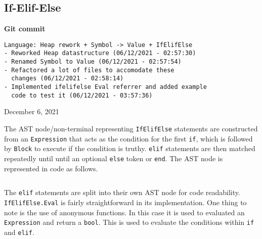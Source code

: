 \subsection{If-Elif-Else}

\begin{center}
    \textbf{Git commit}
    \begin{verbatim}
Language: Heap rework + Symbol -> Value + IfElifElse
- Reworked Heap datastructure (06/12/2021 - 02:57:30)
- Renamed Symbol to Value (06/12/2021 - 02:57:54)
- Refactored a lot of files to accomodate these 
  changes (06/12/2021 - 02:58:14)
- Implemented ifelifelse Eval referrer and added example
  code to test it (06/12/2021 - 03:57:36)
    \end{verbatim}
    \vspace{-1em}
    \tiny{December 6, 2021}
\end{center}

The AST node/non-terminal representing \verb|IfElifElse| statements are constructed from an \verb|Expression| that acts as the condition for the first \verb|if|, which is followed by \verb|Block| to execute if the condition is truthy. \verb|elif| statements are then matched repeatedly until until an optional \verb|else| token or \verb|end|. The AST node is represented in code as follows.

\inputminted[firstline=304, lastline=320, autogobble, breaklines, tabsize=4]{go}{../../src/parser/ast.go}

The \verb|elif| statements are split into their own AST node for code readability. \verb|IfElifElse.Eval| is fairly straightforward in its implementation. One thing to note is the use of anonymous functions. In this case it is used to evaluated an \verb|Expression| and return a \texttt{bool}. This is used to evaluate the conditions within \verb|if| and \verb|elif|.

\inputminted[firstline=801, lastline=815, autogobble, breaklines, tabsize=4]{go}{../../src/parser/eval.go}
